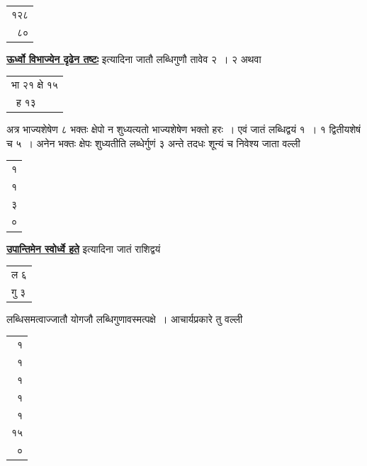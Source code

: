 \documentclass[11pt, openany]{book}
\begin{document}
{{\begin{table}[h!]
    \centering\s
    \begin{tabular}{r}
       १२८\\
८०
       \end{tabular}
\end{table}
\vspace{-2mm}

\noindent \hyperref[51]{\textbf{ऊर्ध्वो विभाज्येन दृढेन तष्टः}} इत्यादिना जातौ लब्धिगुणौ तावेव २~। २ अथवा
\vspace{-2mm}

\begin{table}[h!]
    \centering\s
    \begin{tabular}{l}
    भा २१ क्षे १५ \\
~ह १३
       \end{tabular}
\end{table}
\vspace{-2mm}

\noindent अत्र भाज्यशेषेण ८ भक्तः क्षेपो न शुध्यत्यतो भाज्यशेषेण भक्तो हरः~। एवं
जातं लब्धिद्वयं १~। १ द्वितीयशेषं च ५~। अनेन भक्तः क्षेपः शुध्यतीति
लब्धेर्गुणं ३ अन्ते तदधः शून्यं च निवेश्य जाता वल्ली
\vspace{-2mm}

\begin{table}[h!]
    \centering\s
    \begin{tabular}{r}
    १\\
१\\
३\\
०
      \end{tabular}
\end{table}
\vspace{-2mm}

\noindent \hyperref[51]{\textbf{उपान्तिमेन स्वोर्ध्वे हते}} इत्यादिना जातं राशिद्वयं
\vspace{-2mm}

\begin{table}[h!]
    \centering\s
    \begin{tabular}{l}
       ल ६\\
गु ३
    \end{tabular}
\end{table}
\vspace{-2mm}

\noindent लब्धिसमत्वाज्जातौ योगजौ लब्धिगुणावस्मत्पक्षे~। आचार्यप्रकारे तु वल्ली
\newpage
\begin{table}[h!]
    \centering\s
    \begin{tabular}{r}
    १\\
१\\
१\\
१\\
१\\
१५\\
०
     \end{tabular}
\end{table}
\vspace{-2mm}

}}
\end{document}
